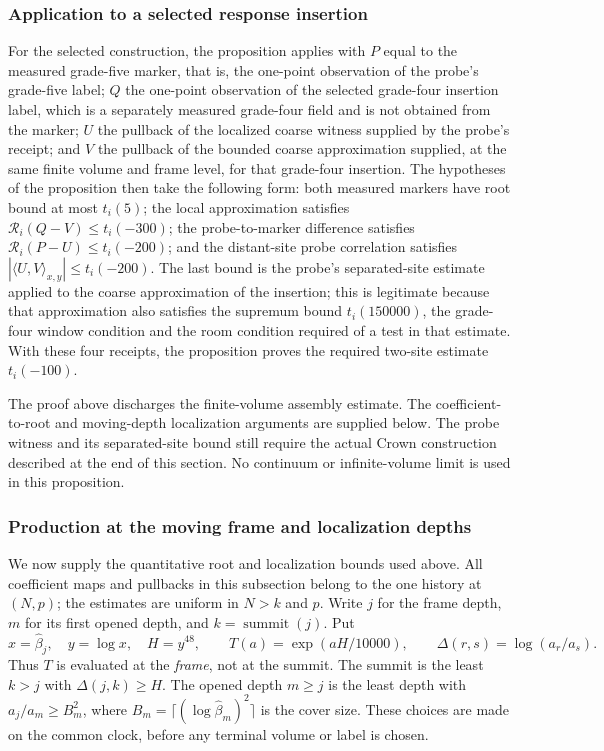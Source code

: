 \subsubsection{Application to a selected response insertion}
\label{subsec:ex-lattice-mileage-application}

For the selected construction, the proposition applies with $P$ equal to
the measured grade-five marker, that is, the one-point observation of the
probe's grade-five label; $Q$ the one-point observation of the selected
grade-four insertion label, which is a separately measured grade-four
field and is not obtained from the marker; $U$ the pullback of the
localized coarse witness supplied by the probe's receipt; and $V$ the
pullback of the bounded coarse approximation supplied, at the same
finite volume and frame level, for that grade-four insertion. The
hypotheses of the proposition then take the following form: both measured
markers have
root bound at most $t_i(5)$; the local approximation satisfies
$\mathcal R_i(Q-V)\le t_i(-300)$; the probe-to-marker difference satisfies
$\mathcal R_i(P-U)\le t_i(-200)$; and the distant-site probe correlation
satisfies $|\langle U,V\rangle_{x,y}|\le t_i(-200)$. The last bound is
the probe's separated-site estimate applied to the coarse approximation
of the insertion; this is legitimate because that approximation also
satisfies the supremum bound $t_i(150000)$, the grade-four window
condition and the room condition required of a test in that estimate.
With these four receipts, the proposition proves the required two-site
estimate $t_i(-100)$.

The proof above discharges the finite-volume assembly estimate. The
coefficient-to-root and moving-depth localization arguments are supplied
below. The probe witness and its separated-site bound still require the
actual Crown construction described at the end of this section. No
continuum or infinite-volume limit is used in this proposition.

\subsubsection{Production at the moving frame and localization depths}
\label{subsec:ex-trace-pairing-production}

We now supply the quantitative root and localization bounds used above.
All coefficient maps and pullbacks in this subsection belong to the one
history at $(N,p)$; the estimates are uniform in $N>k$ and $p$.
Write $j$ for the frame depth, $m$ for its first opened depth, and
$k=\operatorname{summit}(j)$. Put
\[
 x=\widehat\beta_j,\quad y=\log x,\quad H=y^{48},\qquad
 T(a)=\exp(aH/10000),\qquad
 \Delta(r,s)=\log(a_r/a_s).
\]
Thus $T$ is evaluated at the \emph{frame}, not at the summit.
The summit is the least $k>j$ with $\Delta(j,k)\ge H$.
The opened depth $m\ge j$ is the least depth with
$a_j/a_m\ge B_m^2$, where $B_m=\lceil(\log\widehat\beta_m)^2\rceil$
is the cover size. These choices are made on the common clock, before
any terminal volume or label is chosen.

